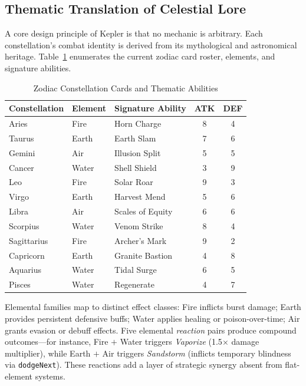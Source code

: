 \documentclass[conference]{IEEEtran}
\begin{document}
\subsection{Thematic Translation of Celestial Lore}
A core design principle of Kepler is that no mechanic is arbitrary. Each constellation's combat identity is derived from its mythological and astronomical heritage. Table~\ref{tab:cards} enumerates the current zodiac card roster, elements, and signature abilities.

\begin{table}[htbp]
\caption{Zodiac Constellation Cards and Thematic Abilities}
\label{tab:cards}
\centering
\renewcommand{\arraystretch}{1.2}
\begin{tabular}{@{}lllcc@{}}
\toprule
\textbf{Constellation} & \textbf{Element} & \textbf{Signature Ability} & \textbf{ATK} & \textbf{DEF} \\
\midrule
Aries        & Fire  & Horn Charge      & 8 & 4 \\
Taurus       & Earth & Earth Slam       & 7 & 6 \\
Gemini       & Air   & Illusion Split   & 5 & 5 \\
Cancer       & Water & Shell Shield     & 3 & 9 \\
Leo          & Fire  & Solar Roar       & 9 & 3 \\
Virgo        & Earth & Harvest Mend     & 5 & 6 \\
Libra        & Air   & Scales of Equity & 6 & 6 \\
Scorpius     & Water & Venom Strike     & 8 & 4 \\
Sagittarius  & Fire  & Archer's Mark    & 9 & 2 \\
Capricorn    & Earth & Granite Bastion  & 4 & 8 \\
Aquarius     & Water & Tidal Surge      & 6 & 5 \\
Pisces       & Water & Regenerate       & 4 & 7 \\
\bottomrule
\end{tabular}
\end{table}

\noindent Elemental families map to distinct effect classes: Fire inflicts burst damage; Earth provides persistent defensive buffs; Water applies healing or poison-over-time; Air grants evasion or debuff effects. Five elemental \textit{reaction} pairs produce compound outcomes—for instance, Fire $+$ Water triggers \textit{Vaporize} (1.5$\times$ damage multiplier), while Earth $+$ Air triggers \textit{Sandstorm} (inflicts temporary blindness via \texttt{dodgeNext}). These reactions add a layer of strategic synergy absent from flat-element systems.
\end{document}
